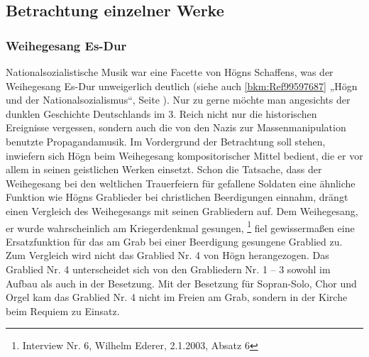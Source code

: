 \subsection{Betrachtung einzelner Werke}
\hypertarget{RefHeadingToc100333752}{}

\subsubsection{Weihegesang Es-Dur}

\label{bkm:Ref100062450}\hypertarget{RefHeadingToc100333753}{}\label{bkm:Ref100062461}\label{bkm:Ref100062456}Nationalsozialistische
Musik war eine Facette von Högns Schaffens, was der Weihegesang Es-Dur
unweigerlich deutlich (siehe auch \ref{bkm:Ref99597687} „Högn und der
Nationalsozialismus“, Seite \pageref{bkm:Ref99597697}). Nur zu gerne
möchte man angesichts der dunklen Geschichte Deutschlands im 3. Reich
nicht nur die historischen Ereignisse vergessen, sondern auch die von
den Nazis zur Massenmanipulation benutzte Propagandamusik. Im
Vordergrund der Betrachtung soll stehen, inwiefern sich Högn beim
Weihegesang kompositorischer Mittel bedient, die er vor allem in seinen
geistlichen Werken einsetzt. Schon die Tatsache, dass der Weihegesang
bei den weltlichen Trauerfeiern für gefallene Soldaten eine ähnliche
Funktion wie Högns Grablieder bei christlichen Beerdigungen einnahm,
drängt einen Vergleich des Weihegesangs mit seinen Grabliedern auf. Dem
Weihegesang, er wurde wahrscheinlich am Kriegerdenkmal
gesungen, \footnote{Interview Nr. 6, Wilhelm Ederer, 2.1.2003, Absatz
6} fiel gewissermaßen eine Ersatzfunktion für das am Grab bei einer
Beerdigung gesungene Grablied zu. Zum Vergleich wird nicht das Grablied
Nr. 4 von Högn herangezogen. Das Grablied Nr. 4 unterscheidet sich von
den Grabliedern Nr. 1 – 3 sowohl im Aufbau als auch in der Besetzung.
Mit der Besetzung für Sopran-Solo, Chor und Orgel kam das Grablied Nr.
4 nicht im Freien am Grab, sondern in der Kirche beim Requiem zu
Einsatz.

